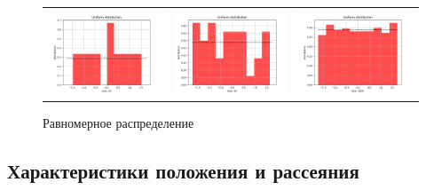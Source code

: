 \documentclass[../main.tex]{subfiles}
\begin{document}
	\begin{figure}[H]
		\centering
		\begin{tabular}{ccc}
			\includegraphics[width=55mm, height =0.25\textheight]{figures/UniformNumber10.png} 
			&
			\includegraphics[width=55mm, height =0.25\textheight]{figures/UniformNumber50.png}
			&
			\includegraphics[width=55mm, height =0.25\textheight]{figures/UniformNumber1000.png}
		\end{tabular}
		\caption{Равномерное распределение} 
		\label{fig:normal}
	\end{figure}
	
	\subsection{Характеристики положения и рассеяния}
	
\end{document}
